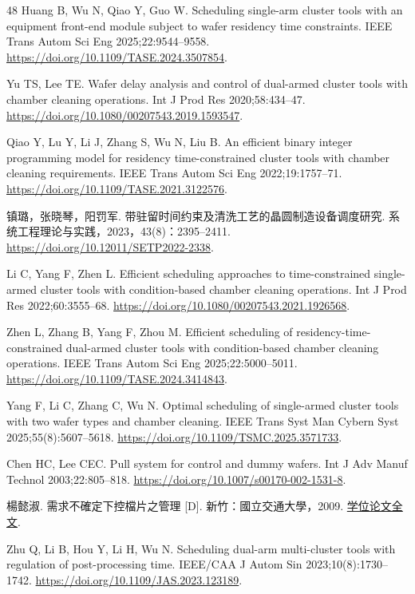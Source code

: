 \begin{thebibliography}{48}
Huang B, Wu N, Qiao Y, Guo W. Scheduling single-arm cluster tools with an equipment front-end module subject to wafer residency time constraints.
IEEE Trans Autom Sci Eng 2025;22:9544--9558.
\url{https://doi.org/10.1109/TASE.2024.3507854}.

Yu TS, Lee TE. Wafer delay analysis and control of dual-armed cluster tools with chamber cleaning operations.
Int J Prod Res 2020;58:434--47.
\url{https://doi.org/10.1080/00207543.2019.1593547}.

Qiao Y, Lu Y, Li J, Zhang S, Wu N, Liu B. An efficient binary integer programming model for residency time-constrained cluster tools with chamber cleaning requirements.
IEEE Trans Autom Sci Eng 2022;19:1757--71.
\url{https://doi.org/10.1109/TASE.2021.3122576}.

镇璐，张晓琴，阳罚军. 带驻留时间约束及清洗工艺的晶圆制造设备调度研究. 系统工程理论与实践，2023，43(8)：2395--2411.
\url{https://doi.org/10.12011/SETP2022-2338}.

Li C, Yang F, Zhen L. Efficient scheduling approaches to time-constrained single-armed cluster tools with condition-based chamber cleaning operations.
Int J Prod Res 2022;60:3555--68.
\url{https://doi.org/10.1080/00207543.2021.1926568}.

Zhen L, Zhang B, Yang F, Zhou M. Efficient scheduling of residency-time-constrained dual-armed cluster tools with condition-based chamber cleaning operations.
IEEE Trans Autom Sci Eng 2025;22:5000--5011.
\url{https://doi.org/10.1109/TASE.2024.3414843}.

Yang F, Li C, Zhang C, Wu N. Optimal scheduling of single-armed cluster tools with two wafer types and chamber cleaning.
IEEE Trans Syst Man Cybern Syst 2025;55(8):5607--5618.
\url{https://doi.org/10.1109/TSMC.2025.3571733}.

Chen HC, Lee CEC. Pull system for control and dummy wafers.
Int J Adv Manuf Technol 2003;22:805--818.
\url{https://doi.org/10.1007/s00170-002-1531-8}.

楊懿淑. 需求不確定下控檔片之管理 [D]. 新竹：國立交通大學，2009.
\href{https://ir.lib.nycu.edu.tw/bitstream/11536/68667/1/380101.pdf}{学位论文全文}.

Zhu Q, Li B, Hou Y, Li H, Wu N. Scheduling dual-arm multi-cluster tools with regulation of post-processing time.
IEEE/CAA J Autom Sin 2023;10(8):1730--1742.
\url{https://doi.org/10.1109/JAS.2023.123189}.


\end{thebibliography}
